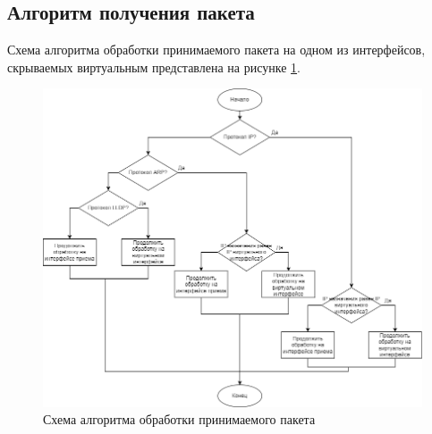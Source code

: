 \documentclass[14pt, a4paper]{extarticle}
\begin{document}
\subsection{Алгоритм получения пакета}
Схема алгоритма обработки принимаемого пакета на одном из интерфейсов, скрываемых виртуальным представлена на рисунке \ref{in}.
\begin{figure}[H]
	\centering
	\includegraphics[scale=0.5]{in.png}
	\caption{Схема алгоритма обработки принимаемого пакета}
	\label{in}
\end{figure}
\end{document}
